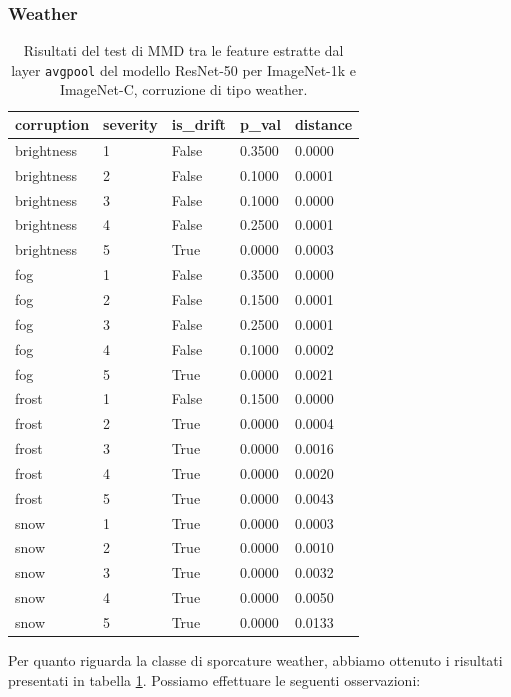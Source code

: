 \subsubsection{Weather}
\begin{table}[H]
  \centering
  \begin{tabular}{lllll}
    \toprule
    corruption & severity & is\_drift & p\_val & distance \\
    \midrule
    brightness & 1 & False & 0.3500 & 0.0000 \\ 
    brightness & 2 & False & 0.1000 & 0.0001 \\ 
    brightness & 3 & False & 0.1000 & 0.0000 \\ 
    brightness & 4 & False & 0.2500 & 0.0001 \\ 
    brightness & 5 & True & 0.0000 & 0.0003 \\ 
    fog & 1 & False & 0.3500 & 0.0000 \\ 
    fog & 2 & False & 0.1500 & 0.0001 \\ 
    fog & 3 & False & 0.2500 & 0.0001 \\ 
    fog & 4 & False & 0.1000 & 0.0002 \\ 
    fog & 5 & True & 0.0000 & 0.0021 \\ 
    frost & 1 & False & 0.1500 & 0.0000 \\ 
    frost & 2 & True & 0.0000 & 0.0004 \\ 
    frost & 3 & True & 0.0000 & 0.0016 \\ 
    frost & 4 & True & 0.0000 & 0.0020 \\ 
    frost & 5 & True & 0.0000 & 0.0043 \\ 
    snow & 1 & True & 0.0000 & 0.0003 \\ 
    snow & 2 & True & 0.0000 & 0.0010 \\ 
    snow & 3 & True & 0.0000 & 0.0032 \\ 
    snow & 4 & True & 0.0000 & 0.0050 \\ 
    snow & 5 & True & 0.0000 & 0.0133 \\ 
    \bottomrule
  \end{tabular}
\caption{Risultati del test di MMD tra le feature estratte dal layer \texttt{avgpool} del modello ResNet-50 per ImageNet-1k e ImageNet-C, corruzione di tipo weather.}
\label{tab:mmd_drift_report_imagenet_c_weather}
\end{table}
Per quanto riguarda la classe di sporcature weather, abbiamo ottenuto i risultati presentati in tabella \ref{tab:mmd_drift_report_imagenet_c_weather}. Possiamo effettuare le seguenti osservazioni:
